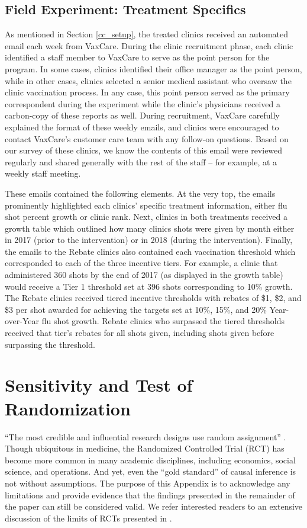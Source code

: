 \subsection{Field Experiment: Treatment Specifics}
As mentioned in Section \ref{cc_setup}, the treated clinics received an automated email each week from VaxCare. During the clinic recruitment phase, each clinic identified a staff member to VaxCare to serve as the point person for the program. In some cases, clinics identified their office manager as the point person, while in other cases, clinics selected a senior medical assistant who oversaw the clinic vaccination process. In any case, this point person served as the primary correspondent during the experiment while the clinic’s physicians received a carbon-copy of these reports as well. During recruitment, VaxCare carefully explained the format of these weekly emails, and clinics were encouraged to contact VaxCare’s customer care team with any follow-on questions. Based on our survey of these clinics, we know the contents of this email were reviewed regularly and shared generally with the rest of the staff – for example, at a weekly staff meeting. 

These emails contained the following elements. At the very top, the emails prominently highlighted each clinics’ specific treatment information, either flu shot percent growth or clinic rank. Next, clinics in both treatments received a growth table which outlined how many clinics shots were given by month either in 2017 (prior to the intervention) or in 2018 (during the intervention). Finally, the emails to the Rebate clinics also contained each vaccination threshold which corresponded to each of the three incentive tiers. For example, a clinic that administered 360 shots by the end of 2017 (as displayed in the growth table) would receive a Tier 1 threshold set at 396 shots corresponding to 10\% growth. The Rebate clinics received tiered incentive thresholds with rebates of \$1, \$2, and \$3 per shot awarded for achieving the targets set at 10\%, 15\%, and 20\% Year-over-Year flu shot growth. Rebate clinics who surpassed the tiered thresholds received that tier’s rebates for all shots given, including shots given before surpassing the threshold.


\section{Sensitivity and Test of Randomization} \label{app_cc_sens}
“The most credible and influential research designs use random assignment” \citep[p. 11]{Angrist2009}. Though ubiquitous in medicine, the Randomized Controlled Trial (RCT) has become more common in many academic disciplines, including economics, social science, and operations. And yet, even the “gold standard” of causal inference is not without assumptions. The purpose of this Appendix is to acknowledge any limitations and provide evidence that the findings presented in the remainder of the paper can still be considered valid. We refer interested readers to an extensive discussion of the limits of RCTs presented in \cite{Deaton2018}. 

